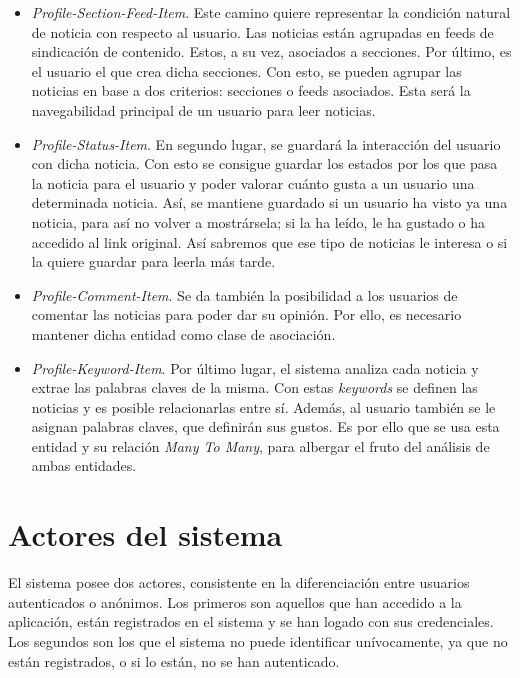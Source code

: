\begin{itemize}
    \item \textit{Profile-Section-Feed-Item}. Este camino quiere representar la condición natural de noticia con respecto al usuario. Las noticias están agrupadas en feeds de sindicación de contenido. Estos, a su vez, asociados a secciones. Por último, es el usuario el que crea dicha secciones. Con esto, se pueden agrupar las noticias en base a dos criterios: secciones o feeds asociados. Esta será la navegabilidad principal de un usuario para leer noticias.
    \item \textit{Profile-Status-Item}. En segundo lugar, se guardará la interacción del usuario con dicha noticia. Con esto se consigue guardar los estados por los que pasa la noticia para el usuario y poder valorar cuánto gusta a un usuario una determinada noticia. Así, se mantiene guardado si un usuario ha visto ya una noticia, para así no volver a mostrársela; si la ha leído, le ha gustado o ha accedido al link original. Así sabremos que ese tipo de noticias le interesa o si la quiere guardar para leerla más tarde.
    \item \textit{Profile-Comment-Item}. Se da también la posibilidad a los usuarios de comentar las noticias para poder dar su opinión. Por ello, es necesario mantener dicha entidad como clase de asociación.
    \item \textit{Profile-Keyword-Item}. Por último lugar, el sistema analiza cada noticia y extrae las palabras claves de la misma. Con estas \textit{keywords} se definen las noticias y es posible relacionarlas entre sí. Además, al usuario también se le asignan palabras claves, que definirán sus gustos. Es por ello que se usa esta entidad y su relación \textit{Many To Many}, para albergar el fruto del análisis de ambas entidades.
\end{itemize}


\section{Actores del sistema}\label{sec:actores del sistema}

El sistema posee dos actores, consistente en la diferenciación entre usuarios autenticados o anónimos. Los primeros son aquellos que han accedido a la aplicación, están registrados en el sistema y se han logado con sus credenciales. Los segundos son los que el sistema no puede identificar unívocamente, ya que no están registrados, o si lo están, no se han autenticado.

